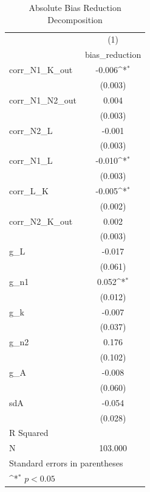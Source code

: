 \begin{table}[htbp]\centering
\def\sym#1{\ifmmode^{#1}\else\(^{#1}\)\fi}
\caption{Absolute Bias Reduction Decomposition}
\begin{tabular}{l*{1}{c}}
\hline\hline
            &\multicolumn{1}{c}{(1)}\\
            &\multicolumn{1}{c}{bias\_reduction}\\
\hline
corr\_N1\_K\_out&      -0.006\sym{*}\\
            &     (0.003)       \\
[1em]
corr\_N1\_N2\_out&       0.004       \\
            &     (0.003)       \\
[1em]
corr\_N2\_L   &      -0.001       \\
            &     (0.003)       \\
[1em]
corr\_N1\_L   &      -0.010\sym{*}\\
            &     (0.003)       \\
[1em]
corr\_L\_K    &      -0.005\sym{*}\\
            &     (0.002)       \\
[1em]
corr\_N2\_K\_out&       0.002       \\
            &     (0.003)       \\
[1em]
g\_L         &      -0.017       \\
            &     (0.061)       \\
[1em]
g\_n1        &       0.052\sym{*}\\
            &     (0.012)       \\
[1em]
g\_k         &      -0.007       \\
            &     (0.037)       \\
[1em]
g\_n2        &       0.176       \\
            &     (0.102)       \\
[1em]
g\_A         &      -0.008       \\
            &     (0.060)       \\
[1em]
sdA         &      -0.054       \\
            &     (0.028)       \\
\hline
R Squared   &                   \\
N           &     103.000       \\
\hline\hline
\multicolumn{2}{l}{\footnotesize Standard errors in parentheses}\\
\multicolumn{2}{l}{\footnotesize \sym{*} \(p<0.05\)}\\
\end{tabular}
\end{table}
